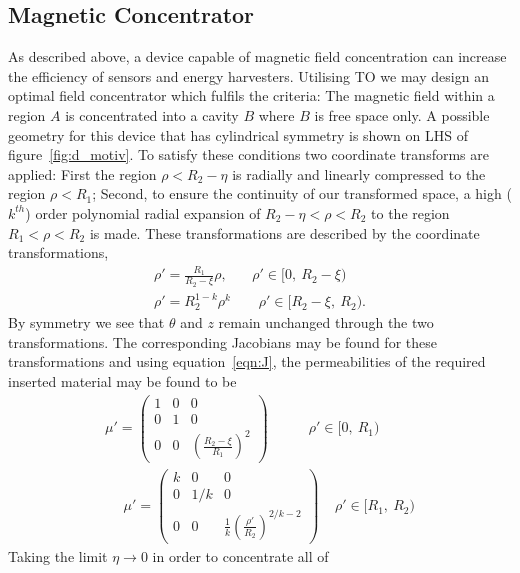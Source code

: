 \documentclass[11pt]{iopart}
\begin{document}
\subsection{Magnetic Concentrator}
As described above, a device capable of magnetic field concentration
can increase the efficiency of sensors and energy harvesters.
Utilising TO we may design an optimal field concentrator which fulfils
the criteria: The magnetic field within a region $A$ is concentrated
into a cavity $B$ where $B$ is free space only. A possible geometry
for this device that has cylindrical symmetry is shown on LHS of
figure~\ref{fig:d_motiv}.  To satisfy these conditions two coordinate
transforms are applied: First the region $\rho < R_2 - \eta$ is
radially and linearly compressed to the region $\rho < R_1$; Second,
to ensure the continuity of our transformed space, a high ($k^{th}$)
order polynomial radial expansion of $R_2 - \eta < \rho < R_2$ to the
region $R_1 < \rho < R_2$ is made. These transformations are described
by the coordinate transformations,
\begin{equation}
  \label{eqn:transform}
  \begin{split}
\rho' = \frac{R_1}{R_2-\xi}\rho,~~~~~~~~\rho'\in[0,~R_2-\xi)~~\\
\rho' = R_2^{1-k}\rho^k~~~~~~~~~\rho'\in[R_2-\xi,~R_2).
  \end{split}
\end{equation}
By symmetry we see that $\theta$ and $z$ remain unchanged through the
two transformations. The corresponding Jacobians may be found for
these transformations and using equation~\ref{eqn:J}, the
permeabilities of the required inserted material may be found to be
\begin{equation}
  \label{eqn:mat}
  \begin{split}
 \mu' = \begin{pmatrix}1&0&0\\0&1&0\\0&0&(\frac{R_2-\xi}{R_1})^2\end{pmatrix}~~~~~~~~~~~~~\rho'\in[0,~R_1)~~\\
~~~~~~\mu' = \begin{pmatrix}k&0&0\\0&1/k&0\\0&0&\frac{1}{k}(\frac{\rho'}{R_2})^{2/k-2}\end{pmatrix}~~~~~\rho'\in[R_1,~R_2)
  \end{split}
\end{equation}
Taking the limit $\eta \rightarrow 0$ in order to concentrate all of
\end{document}

